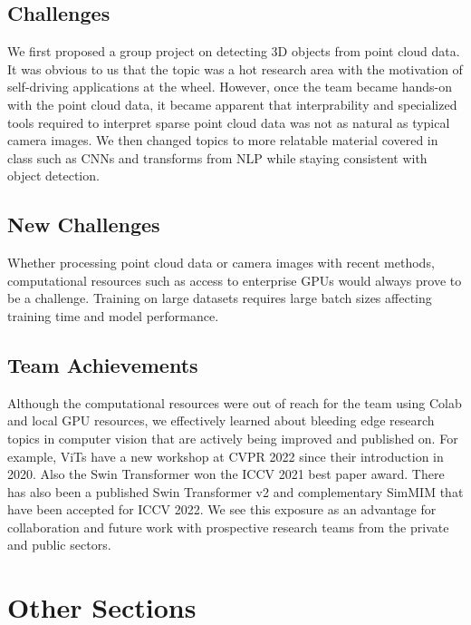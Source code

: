 \documentclass[10pt,twocolumn,letterpaper]{article}
\begin{document}
\subsection{Challenges}

We first proposed a group project on detecting 3D objects from point cloud data. It was obvious to us that the topic was a hot research area with the motivation of self-driving applications at the wheel. However, once the team became hands-on with the point cloud data, it became apparent that interprability and specialized tools required to interpret sparse point cloud data was not as natural as typical camera images. We then changed topics to more relatable material covered in class such as CNNs and transforms from NLP while staying consistent with object detection.

\subsection{New Challenges}

Whether processing point cloud data or camera images with recent methods, computational resources such as access to enterprise GPUs would always prove to be a challenge. Training on large datasets requires large batch sizes affecting training time and model performance.

\subsection{Team Achievements}

Although the computational resources were out of reach for the team using Colab and local GPU resources, we effectively learned about bleeding edge research topics in computer vision that are actively being improved and published on. For example, ViTs have a new workshop at CVPR 2022 since their introduction in 2020. Also the Swin Transformer won the ICCV 2021 best paper award. There has also been a published Swin Transformer v2 and complementary SimMIM that have been accepted for ICCV 2022. We see this exposure as an advantage for collaboration and future work with prospective research teams from the private and public sectors.

\section{Other Sections}
\end{document}
